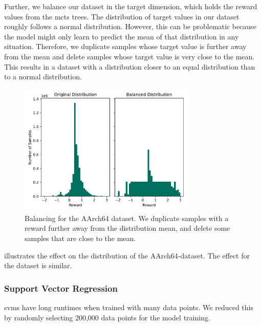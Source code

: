 Further, we balance our dataset in the target dimension, which holds the reward values from the \ac{mcts} trees.
The distribution of target values in our dataset roughly follows a normal distribution.
However, this can be problematic because the model might only learn to predict the mean of that distribution in any situation.
Therefore, we duplicate samples whose target value is further away from the mean and delete samples whose target value is very close to the mean.
This results in a dataset with a distribution closer to an equal distribution than to a normal distribution.
\begin{figure}
    \centering
    \includegraphics[width=0.75\textwidth]{img/balanced-supervised-dataset-rpi.pdf}
    \caption[Balancing for the AArch64 Dataset]{Balancing for the AArch64 dataset. 
    We duplicate samples with a reward further away from the distribution mean, and delete some samples that are close to the mean.}
    \label{fig:eval:balanced-dataset}
\end{figure}
 illustrates the effect on the distribution of the AArch64-dataset.
The effect for the \aurora{} dataset is similar.

\subsubsection{Support Vector Regression}
\label{sec:eval:svm}
\acp{svm} have long runtimes when trained with many data points.
We reduced this by randomly selecting 200,000 data points for the model training.

